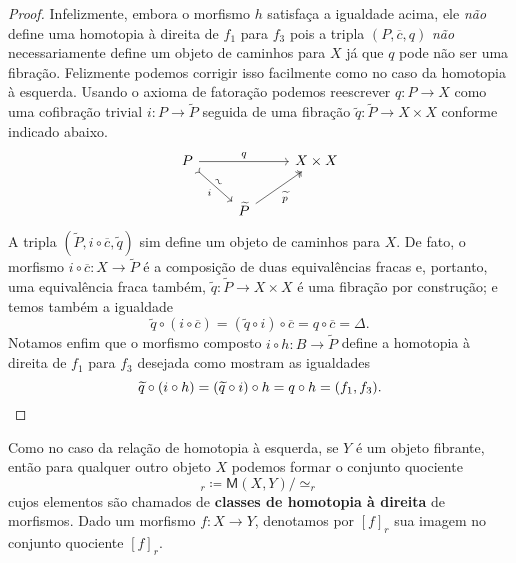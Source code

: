 \begin{proof}
  Infelizmente, embora o morfismo $h$ satisfaça a igualdade acima, ele \emph{não} define uma homotopia à direita de $f_{1}$ para $f_{3}$ pois a tripla $(P,\overline{c},q)$ \emph{não} necessariamente define um objeto de caminhos para $X$ já que $q$ pode não ser uma fibração.
  Felizmente podemos corrigir isso facilmente como no caso da homotopia à esquerda.
  Usando o axioma de fatoração podemos reescrever $q: P \to X$ como uma cofibração trivial $i: P \to \widetilde{P}$ seguida de uma fibração $\widetilde{q}: \widetilde{P} \to X \times X$ conforme indicado abaixo.
  \begin{displaymath}
    \begin{tikzcd}
      P
      \arrow[rr, "q"]
      \arrow[rd, tail, "i" {swap}, "\sim" {sloped}]
      & & X \times X
      \\ & \widetilde{P}
      \arrow[ru, two heads, "\widetilde{p}" swap]
    \end{tikzcd}
  \end{displaymath}
  A tripla $(\widetilde{P},i \circ \overline{c},\widetilde{q})$ sim define um objeto de caminhos para $X$.
  De fato, o morfismo $i \circ \overline{c}: X \to \widetilde{P}$ é a composição de duas equivalências fracas e, portanto, uma equivalência fraca também, $\widetilde{q}: \widetilde{P} \to X \times X$ é uma fibração por construção; e temos também a igualdade
  \begin{displaymath}
    \widetilde{q} \circ (i \circ \overline{c}) = (\widetilde{q} \circ i) \circ \overline{c} = q \circ \overline{c} = \Delta.
  \end{displaymath}
  Notamos enfim que o morfismo composto $i \circ h: B \to \widetilde{P}$ define a homotopia à direita de $f_{1}$ para $f_{3}$ desejada como mostram as igualdades
  \begin{displaymath}
    \widetilde{q} \circ (i \circ h) = (\widetilde{q} \circ i) \circ h = q \circ h = (f_{1},f_{3}). \qedhere
  \end{displaymath}
\end{proof}

Como no caso da relação de homotopia à esquerda, se $Y$ é um objeto fibrante, então para qualquer outro objeto $X$ podemos formar o conjunto quociente
\begin{displaymath}
  [X,Y]_{r} \coloneqq \mathsf{M}(X,Y)/\simeq_{r}
\end{displaymath}
cujos elementos são chamados de \textbf{classes de homotopia à direita} de morfismos.
Dado um morfismo $f: X \to Y$, denotamos por $[f]_{r}$ sua imagem no conjunto quociente $[f]_{r}$.

